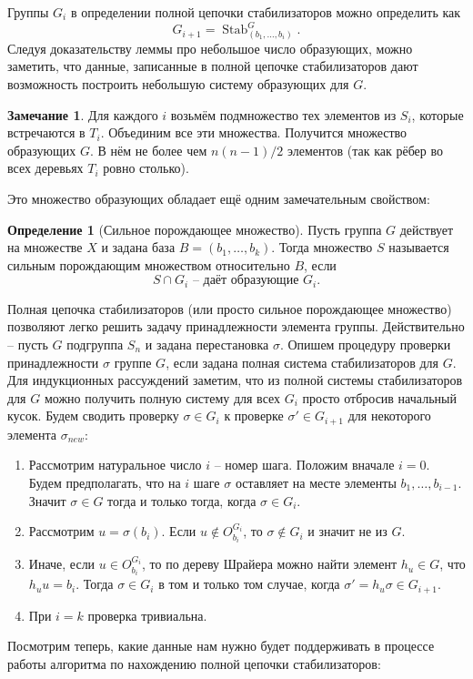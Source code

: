 \documentclass[10pt,a4paper,oneside]{book}
\theoremstyle{definition}
\newtheorem*{rem}{\color{green!50!blue}Замечание}
\newtheorem*{defn}{\color{yellow!30!red} Определение}
\newcommand{\Stab}{\operatorname{Stab}}
\def\dfn{\begin{defn}}
\def\edfn{\end{defn}}
\def\rm{\begin{rem}}
\def\erm{\end{rem}}
\def\enm{\begin{enumerate}}
\def\eenm{\end{enumerate}}
\begin{document}
Группы $G_i$ в определении полной цепочки стабилизаторов можно определить как
$$G_{i+1} = \Stab_{(b_1,\dots,b_i)}^G.$$
Следуя доказательству леммы про небольшое число образующих, можно заметить, что данные, записанные в полной цепочке стабилизаторов дают возможность построить небольшую систему образующих для $G$.

\rm Для каждого $i$ возьмём подмножество тех элементов из $S_i$, которые встречаются в $T_i$. Объединим все эти множества. Получится множество образующих $G$. В нём не более чем $n(n-1)/2$ элементов (так как рёбер во всех деревьях $T_i$ ровно столько). 
\erm

Это множество образующих обладает ещё одним замечательным свойством:

\dfn[Сильное порождающее множество] Пусть группа $G$ действует на множестве $X$ и задана база $B=(b_1,\dots,b_k)$. Тогда множество $S$ называется сильным порождающим множеством относительно $B$, если 
$$S\cap G_i \text{ -- даёт образующие } G_i.$$ 
\edfn

Полная цепочка стабилизаторов (или просто сильное порождающее множество) позволяют легко решить задачу принадлежности элемента группы. Действительно -- пусть $G$ подгруппа $S_n$ и задана перестановка $\sigma$. Опишем процедуру проверки принадлежности $\sigma$ группе $G$, если задана полная система стабилизаторов для $G$.  Для индукционных рассуждений заметим, что из полной системы стабилизаторов для $G$ можно получить полную систему для всех $G_i$ просто отбросив начальный кусок. Будем сводить проверку $\sigma \in G_i$ к проверке $\sigma'\in G_{i+1}$ для некоторого элемента $\sigma_{new}$:
\enm
\item Рассмотрим натуральное число $i$ -- номер шага. Положим вначале $i=0$. Будем предполагать, что на $i$ шаге $\sigma$ оставляет на месте элементы $b_1,\dots,b_{i-1}$. Значит $\sigma \in G$ тогда и только тогда, когда $\sigma \in G_i$.
\item Рассмотрим $u=\sigma(b_i)$. Если $u\notin O_{b_i}^{G_i}$, то $\sigma \notin G_i$ и значит не из $G$.
\item Иначе, если $u\in O_{b_i}^{G_i}$, то по дереву Шрайера можно найти элемент $h_u\in G$, что $h_u u=b_i$. Тогда $\sigma \in G_i$ в том и только том случае, когда $\sigma'=h_u\sigma \in G_{i+1}$.
\item При $i=k$ проверка тривиальна.
\eenm

Посмотрим теперь, какие данные нам нужно будет поддерживать в процессе работы алгоритма по нахождению полной цепочки стабилизаторов:
\end{document}
